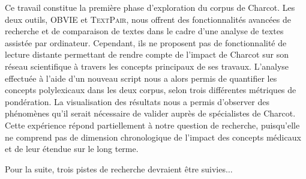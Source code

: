 



Ce travail constitue la première phase d'exploration du corpus de Charcot. Les deux outils, \textsc{OBVIE} et \textsc{TextPair}, nous offrent des fonctionnalités avancées de recherche et de comparaison de textes dans le cadre d'une analyse de textes assistée par ordinateur. Cependant, ils ne proposent pas de fonctionnalité de lecture distante permettant de rendre compte de l'impact de Charcot sur son réseau scientifique à travers les concepts principaux de ses travaux. L'analyse effectuée à l'aide d'un nouveau script nous a alors permis de quantifier les concepts polylexicaux dans les deux corpus, selon trois différentes métriques de pondération. La visualisation des résultats nous a permis d'observer des phénomènes qu'il serait nécessaire de valider auprès de spécialistes de Charcot. Cette expérience répond partiellement à notre question de recherche, puisqu'elle ne comprend pas de dimension chronologique de l'impact des concepts médicaux et de leur étendue sur le long terme.

Pour la suite, trois pistes de recherche devraient être suivies$\dots$ 



